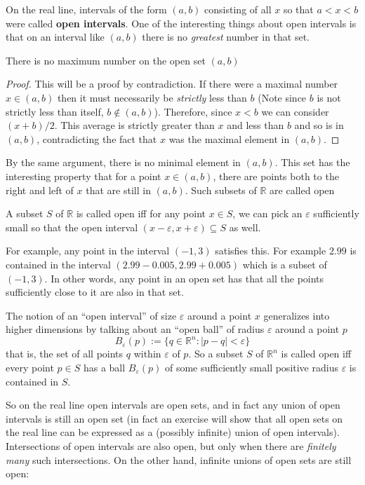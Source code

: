 \documentclass[../master.tex]{subfiles}
\begin{document}
	On the real line, intervals of the form $(a,b)$ consisting of all $x$ so that $a<x<b$ were called \textbf{open intervals}. One of the interesting things about open intervals is that on an interval like $(a,b)$ there is no \emph{greatest} number in that set. 
	\begin{prop}
		There is no maximum number on the open set $(a,b)$
	\end{prop} 
	\begin{proof}
		This will be a proof by contradiction. If there were a maximal number $x \in (a,b)$ then it must necessarily be \emph{strictly} less than $b$ (Note since $b$ is not strictly less than itself, $b \notin (a,b)$). Therefore, since $x<b$ we can consider $(x+b)/2$. This average is strictly greater than $x$ and less than $b$ and so is in $(a,b)$, contradicting the fact that $x$ was the maximal element in $(a,b)$.
	\end{proof}
	By the same argument, there is no minimal element in $(a,b)$. This set has the interesting property that for a point $x \in (a,b)$, there are points both to the right and left of $x$ that are still in $(a,b)$. Such subsets of $\mathbb{R}$ are called open
	
	\begin{defn}
		A subset $S$ of $\mathbb{R}$ is called open iff for any point $x \in S$, we can pick an $\varepsilon$ sufficiently small so that the open interval $(x-\varepsilon, x+\varepsilon) \subseteq S$ as well.
	\end{defn}
	For example, any point in the interval $(-1,3)$ satisfies this. For example $2.99$ is contained in the interval $(2.99 - 0.005, 2.99+0.005)$ which is a subset of  $(-1,3)$. In other words, any point in an open set has that all the points sufficiently close to it are also in that set.
	
	
	The notion of an ``open interval'' of size $\varepsilon$ around a point $x$ generalizes into higher dimensions by talking about an ``open ball'' of radius $\varepsilon$ around a point $p$
	\begin{equation}
		B_{\varepsilon} (p) := \{ q \in \mathbb{R}^n : |p-q|<\varepsilon \}
	\end{equation}
	that is, the set of all points $q$ within $\varepsilon$ of $p$. So a subset $S$ of $\mathbb{R}^n$ is called open iff every point $p \in S$ has a ball $B_\varepsilon(p)$ of some sufficiently small positive radius $\varepsilon$ is contained in $S$.
	
	So on the real line open intervals are open sets, and in fact any union of open intervals is still an open set (in fact an exercise will show that all open sets on the real line can be expressed as a (possibly infinite) union of open intervals). Intersections of open intervals are also open, but only when there are \emph{finitely many} such intersections. On the other hand, infinite unions of open sets are still open:
	
\end{document}
